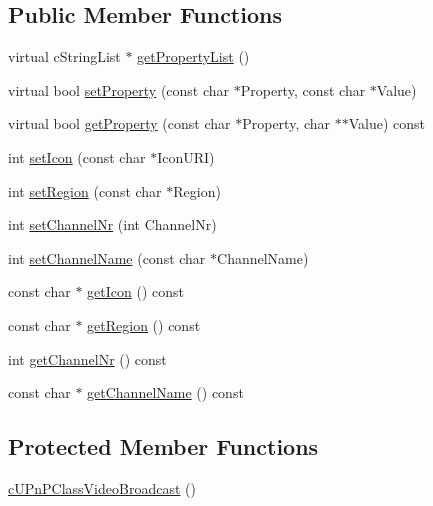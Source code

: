 \subsection*{Public Member Functions}
\begin{CompactItemize}
\item 
virtual cStringList $\ast$ \hyperlink{classcUPnPClassVideoBroadcast_192f6a04c87fe8d56f99c71337cf0f68}{getPropertyList} ()
\item 
virtual bool \hyperlink{classcUPnPClassVideoBroadcast_ce7a341834e448479d3c8f4f0254ce43}{setProperty} (const char $\ast$Property, const char $\ast$Value)
\item 
virtual bool \hyperlink{classcUPnPClassVideoBroadcast_e1d13a13de094337cea6be214c4da0f0}{getProperty} (const char $\ast$Property, char $\ast$$\ast$Value) const 
\item 
int \hyperlink{classcUPnPClassVideoBroadcast_13e432f8a97072f3b45b1d199b82ae02}{setIcon} (const char $\ast$IconURI)
\item 
int \hyperlink{classcUPnPClassVideoBroadcast_228fcc06291dc3989917bbfa5ce3153f}{setRegion} (const char $\ast$Region)
\item 
int \hyperlink{classcUPnPClassVideoBroadcast_4a7804c6c86531d7e23cbc714daa6077}{setChannelNr} (int ChannelNr)
\item 
int \hyperlink{classcUPnPClassVideoBroadcast_b3d1740f8ad67cec1c82c23078b03189}{setChannelName} (const char $\ast$ChannelName)
\item 
const char $\ast$ \hyperlink{classcUPnPClassVideoBroadcast_f4c2a9f5d62e41d853385b7b7685d536}{getIcon} () const 
\item 
const char $\ast$ \hyperlink{classcUPnPClassVideoBroadcast_f4582c82588879c110947fdfc50b7895}{getRegion} () const 
\item 
int \hyperlink{classcUPnPClassVideoBroadcast_6065509557e13176878098861fcfeb9d}{getChannelNr} () const 
\item 
const char $\ast$ \hyperlink{classcUPnPClassVideoBroadcast_b63ea63a4ab8ac3cb654b0bab4df620a}{getChannelName} () const 
\end{CompactItemize}
\subsection*{Protected Member Functions}
\begin{CompactItemize}
\item 
\hyperlink{classcUPnPClassVideoBroadcast_a8d1e73bc9cbb20da6727f3c2e823d79}{cUPnPClassVideoBroadcast} ()
\end{CompactItemize}
